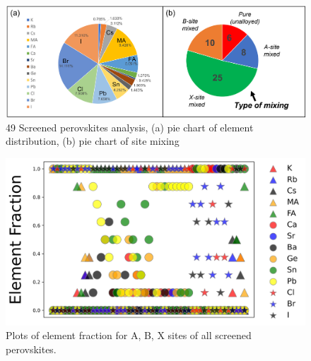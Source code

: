 \documentclass[twoside, twocolumn, 9pt, draft]{article}
\begin{document}
\begin{figure}
\centering
\includegraphics[width=.9\linewidth]{screening_pie.png}
\caption{\label{fig:cuts} 49 Screened perovskites analysis, (a) pie chart of element distribution, (b) pie chart of site mixing}
\end{figure}

\begin{figure}
\centering
\includegraphics[width=.9\linewidth]{Element_Frac.jpg}
\caption{\label{fig:cuts} Plots of element fraction for A, B, X sites of all screened perovskites.}
\end{figure}
\end{document}

